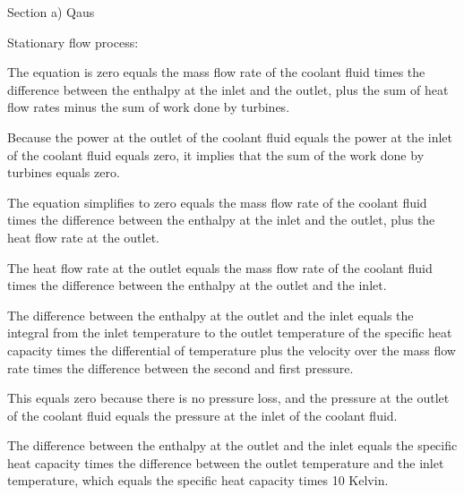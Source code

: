 Section a) Qaus

Stationary flow process:

The equation is zero equals the mass flow rate of the coolant fluid times the difference between the enthalpy at the inlet and the outlet, plus the sum of heat flow rates minus the sum of work done by turbines.

Because the power at the outlet of the coolant fluid equals the power at the inlet of the coolant fluid equals zero, it implies that the sum of the work done by turbines equals zero.

The equation simplifies to zero equals the mass flow rate of the coolant fluid times the difference between the enthalpy at the inlet and the outlet, plus the heat flow rate at the outlet.

The heat flow rate at the outlet equals the mass flow rate of the coolant fluid times the difference between the enthalpy at the outlet and the inlet.

The difference between the enthalpy at the outlet and the inlet equals the integral from the inlet temperature to the outlet temperature of the specific heat capacity times the differential of temperature plus the velocity over the mass flow rate times the difference between the second and first pressure.

This equals zero because there is no pressure loss, and the pressure at the outlet of the coolant fluid equals the pressure at the inlet of the coolant fluid.

The difference between the enthalpy at the outlet and the inlet equals the specific heat capacity times the difference between the outlet temperature and the inlet temperature, which equals the specific heat capacity times 10 Kelvin.